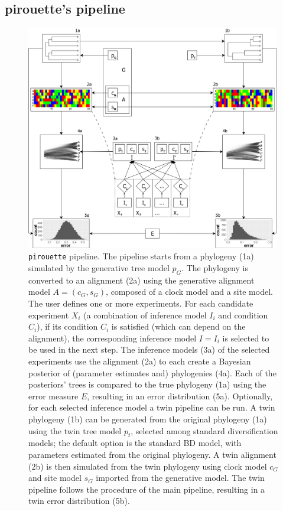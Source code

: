 \subsection{pirouette's pipeline}
\label{subsec:pipeline}

\begin{figure}
  \centering
  \includegraphics[width = 0.99\textwidth]{workflow4.png}
  \caption{
    \texttt{pirouette} pipeline.
    The pipeline starts from a phylogeny (1a) simulated by the 
    generative tree model 
    $\mathit{p_{G}}$.
    The phylogeny is converted to an alignment (2a) using the generative 
    alignment model 
    $\mathit{A} = (\mathit{c_{G}}, \mathit{s_{G}})$, composed of a clock model and a site model. 
    The user defines one or more experiments.
    For each candidate experiment $\mathit{X_{i}}$ 
    (a combination of inference model $\mathit{I_{i}}$ and condition $\mathit{C_{i}}$),
    if its condition $\mathit{C_{i}}$ is 
    satisfied (which can depend on the alignment), 
    the corresponding inference model $\mathit{I} = \mathit{I_{i}}$ is selected
    to be used in the next step.
    The inference models (3a) of the selected experiments use the alignment (2a) 
    to each create a Bayesian posterior of (parameter estimates and) 
    phylogenies (4a). 
    Each of the posteriors' trees is compared to the true phylogeny (1a) 
    using the error measure $\mathit{E}$, 
    resulting in an error distribution (5a). 
    Optionally, for each selected inference model a twin pipeline can be run.
    A twin phylogeny (1b) can be generated from the original 
    phylogeny (1a) using the twin tree model $\mathit{p_{t}}$, 
    selected among standard diversification models; 
    the default option is the standard BD model, 
    with parameters estimated from the original phylogeny.
    A twin alignment (2b) is then simulated from the twin phylogeny 
    using clock model $\mathit{c_{G}}$ and site model $\mathit{s_{G}}$ 
    imported from the generative model. 
    The twin pipeline follows the procedure of the main pipeline, 
    resulting in a twin error distribution (5b).
  }
  \label{fig:pipeline}
\end{figure}

